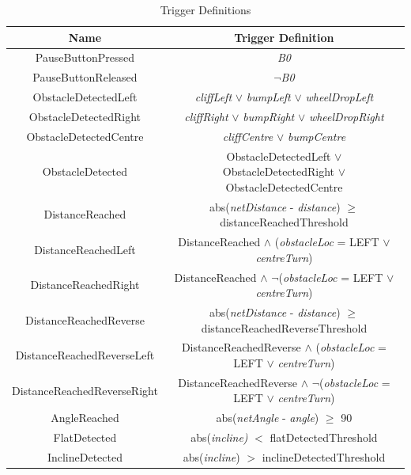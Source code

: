 \begin{table}[p]
    \centering
    \begin{tabular}{|c|c|}
        \hline
        Name        & Trigger Definition \\
        \hline\hline
        PauseButtonPressed & \textit{B0} \\
        \hline
        PauseButtonReleased    & $\neg$\textit{B0}  \\
        \hline
        ObstacleDetectedLeft & \textit{cliffLeft} $\lor$ \textit{bumpLeft} $\lor$ \textit{wheelDropLeft}\\
        \hline
        ObstacleDetectedRight & \textit{cliffRight} $\lor$ \textit{bumpRight} $\lor$ \textit{wheelDropRight}\\
        \hline
        ObstacleDetectedCentre & \textit{cliffCentre} $\lor$ \textit{bumpCentre}\\
        \hline
        ObstacleDetected & ObstacleDetectedLeft $\lor$ ObstacleDetectedRight $\lor$ ObstacleDetectedCentre\\
        \hline
        DistanceReached & abs(\textit{netDistance} - \textit{distance}) $\geq$ distanceReachedThreshold\\
        \hline
        DistanceReachedLeft & DistanceReached $\land$ (\textit{obstacleLoc} = LEFT $\lor$ \textit{centreTurn})\\
        \hline
        DistanceReachedRight & DistanceReached $\land$ $\neg$(\textit{obstacleLoc} = LEFT $\lor$ \textit{centreTurn})\\
        \hline
        DistanceReachedReverse & abs(\textit{netDistance} - \textit{distance}) $\geq$ distanceReachedReverseThreshold\\
        \hline
        DistanceReachedReverseLeft & DistanceReachedReverse $\land$ (\textit{obstacleLoc} = LEFT $\lor$ \textit{centreTurn})\\
        \hline
        DistanceReachedReverseRight & DistanceReachedReverse $\land$ $\neg$(\textit{obstacleLoc} = LEFT $\lor$ \textit{centreTurn})\\
        \hline
        AngleReached & abs(\textit{netAngle} - \textit{angle}) $\geq$ 90\\
        \hline
        FlatDetected & abs(\textit{incline)} $<$ flatDetectedThreshold\\
        \hline
        InclineDetected & abs(\textit{incline}) $>$ inclineDetectedThreshold\\
        \hline
    \end{tabular}
    \caption{Trigger Definitions}
    \label{tab:triggers}
\end{table}

